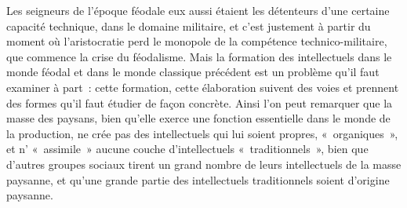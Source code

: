\documentclass[french,twoside]{book} %
\begin{document}
\begin{enumerate}[itemsep=\baselineskip,]
 Les seigneurs de l’époque féodale eux aussi étaient les détenteurs d’une certaine capacité technique, dans le domaine militaire, et c’est justement à partir du moment où l’aristocratie perd le monopole de la compétence technico-militaire, que commence la crise du féodalisme. Mais la formation des intellectuels dans le monde féodal et dans le monde classique précédent est un problème qu’il faut examiner à part : cette formation, cette élaboration suivent des voies et prennent des formes qu’il faut étudier de façon concrète. Ainsi l’on peut remarquer que la masse des paysans, bien qu’elle exerce une fonction essentielle dans le monde de la production, ne crée pas des intellectuels qui lui soient propres, « organiques », et n’ « assimile » aucune couche d’intellectuels « traditionnels », bien que d’autres groupes sociaux tirent un grand nombre de leurs intellectuels de la masse paysanne, et qu’une grande partie des intellectuels traditionnels soient d’origine paysanne.
 

\end{enumerate}
\end{document}

